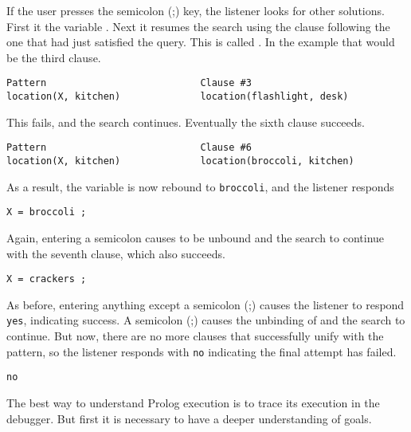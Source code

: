 If the user presses the semicolon (;) key, the listener looks for other
solutions. First it  the variable . Next it resumes the
search using the clause following the one that had just satisfied the query.
This is called . In the example that
would be the third clause.
\begin{verbatim}
Pattern                           Clause #3 
location(X, kitchen)              location(flashlight, desk) 
\end{verbatim}

This fails, and the search continues. Eventually the sixth clause succeeds.
\begin{verbatim}
Pattern                           Clause #6 
location(X, kitchen)              location(broccoli, kitchen) 
\end{verbatim}

As a result, the variable  is now rebound to \verb'broccoli', and the
listener responds
\begin{verbatim}
X = broccoli ;
\end{verbatim}

Again, entering a semicolon \keys{;} causes  to be unbound and the search
to continue with the seventh clause, which also succeeds.
\begin{verbatim}
X = crackers ;
\end{verbatim}

As before, entering anything except a semicolon (;) causes the listener to
respond \verb'yes', indicating success. A semicolon (;) causes the unbinding of
 and the search to continue. But now, there are no more clauses that
successfully unify with the pattern, so the listener responds with \verb'no'
indicating the final attempt has failed.
\begin{verbatim}
no 
\end{verbatim}
The best way to understand Prolog execution is to trace its execution in the
debugger. But first it is necessary to have a deeper understanding of goals.



\secup